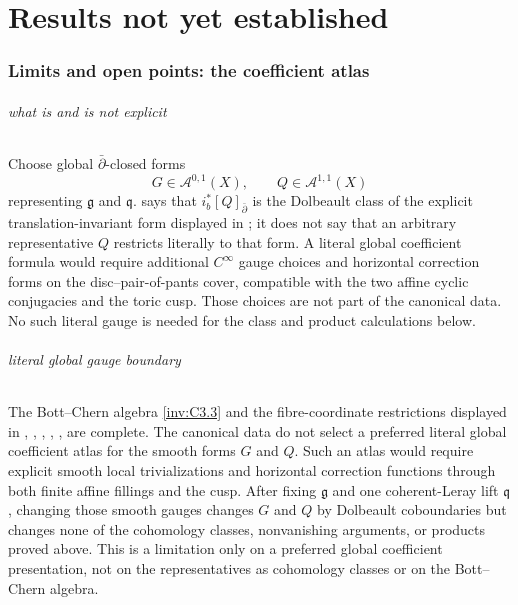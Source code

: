 \clearpage
\part{Results not yet established}
\section{Limits and open points: the coefficient atlas}

\paragraph{what is and is not explicit}
\label{wb:rem:bcpr-literal-gauge}
Choose global $\bar\partial$-closed forms
\begin{equation}
 G\in\mathcal A^{0,1}(X),\qquad
 Q\in\mathcal A^{1,1}(X)
\end{equation}
representing $\mathfrak g$ and $\mathfrak q$.
 says that
$i_b^*[Q]_{\bar\partial}$ is the Dolbeault class of the explicit
translation-invariant
form displayed in ; it does not say that an arbitrary
representative $Q$ restricts literally to that form.  A literal global
coefficient formula would require additional $C^\infty$ gauge choices and
horizontal correction forms on the disc--pair-of-pants cover, compatible
with the two affine cyclic conjugacies and the toric cusp.  Those choices
are not part of the canonical data.  No such literal gauge is needed for
the class and product calculations below.




\paragraph{literal global gauge boundary}
\label{wb:rem:bcpr-global-gauge-boundary}
The Bott--Chern algebra \cref{inv:C3.3} and the fibre-coordinate
restrictions displayed in
, , , , , 
are complete.  The canonical data do not select a preferred literal global
coefficient atlas for the smooth forms $G$ and $Q$.  Such an atlas would
require explicit smooth local trivializations and horizontal correction
functions through both finite affine fillings and the cusp.  After fixing
$\mathfrak g$ and one coherent-Leray lift $\mathfrak q$, changing those
smooth gauges changes $G$ and $Q$ by Dolbeault coboundaries but changes
none of the cohomology classes, nonvanishing arguments, or products proved
above.  This is a limitation only on a preferred global coefficient
presentation, not on the representatives as cohomology classes or on the
Bott--Chern algebra.


